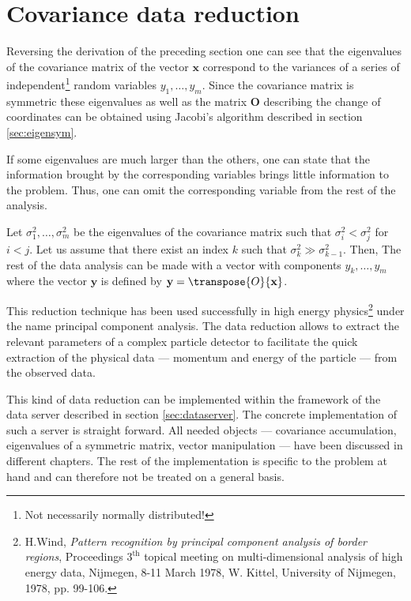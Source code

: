 \section{Covariance data reduction}
\label{sec:datared} Reversing the derivation of the preceding
section one can see that the eigenvalues of the covariance matrix
of the vector $\textbf{x}$ correspond to the variances of a series of
independent\footnote{Not necessarily normally distributed!} random
variables $y_1,\dots,y_m$. Since the covariance matrix is
symmetric these eigenvalues as well as the matrix $\textbf{O}$
describing the change of coordinates can be obtained using
Jacobi's algorithm described in section \ref{sec:eigensym}.

If some eigenvalues are much larger than the others, one can state
that the information brought by the corresponding variables brings
little information to the problem. Thus, one can omit the
corresponding variable from the rest of the analysis.

Let $\sigma^2_1,\ldots,\sigma^2_m$ be the eigenvalues of the
covariance matrix such that $\sigma^2_i < \sigma^2_j$ for $i<j$.
Let us assume that there exist an index $k$ such that $\sigma^2_k
\gg \sigma^2_{k-1}$. Then,  The rest of the data analysis can be
made with a vector with components $y_k,\ldots,y_m$ where the
vector $\textbf{y}$ is defined by $\textbf{y}=\transpose{O}{\textbf x}$.

This reduction technique has been used successfully in high energy
physics\footnote{H.Wind, {\em Pattern recognition by principal
component analysis of border regions}, Proceedings $3^{\mathop\textrm{
th}}$ topical meeting on multi-dimensional analysis of high energy
data, Nijmegen, 8-11 March 1978, W. Kittel, University of
Nijmegen, 1978, pp. 99-106.} under the name principal component
analysis. The data reduction allows to extract the relevant
parameters of a complex particle detector to facilitate the quick
extraction of the physical data --- momentum and energy of the
particle --- from the observed data.

This kind of data reduction can be implemented within the
framework of the data server described in section
\ref{sec:dataserver}. The concrete implementation of such a server
is straight forward. All needed objects --- covariance
accumulation, eigenvalues of a symmetric matrix, vector
manipulation --- have been discussed in different chapters. The
rest of the implementation is specific to the problem at hand and
can therefore not be treated on a general basis.

